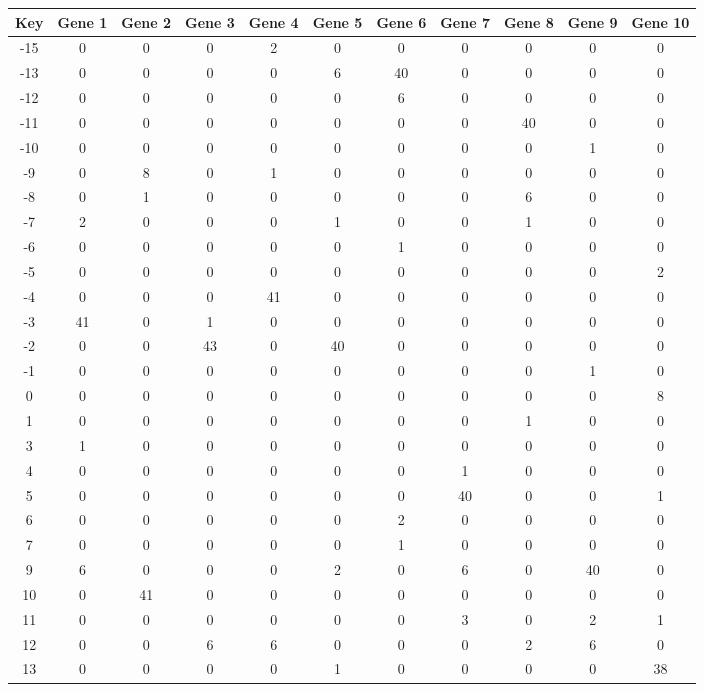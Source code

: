 \begin{tabular}{|c|c|c|c|c|c|c|c|c|c|c|}
\hline
Key & Gene 1 & Gene 2 & Gene 3 & Gene 4 & Gene 5 & Gene 6 & Gene 7 & Gene 8 & Gene 9 & Gene 10 \\
\hline
-15 & 0 & 0 & 0 & 2 & 0 & 0 & 0 & 0 & 0 & 0 \\
-13 & 0 & 0 & 0 & 0 & 6 & 40 & 0 & 0 & 0 & 0 \\
-12 & 0 & 0 & 0 & 0 & 0 & 6 & 0 & 0 & 0 & 0 \\
-11 & 0 & 0 & 0 & 0 & 0 & 0 & 0 & 40 & 0 & 0 \\
-10 & 0 & 0 & 0 & 0 & 0 & 0 & 0 & 0 & 1 & 0 \\
-9 & 0 & 8 & 0 & 1 & 0 & 0 & 0 & 0 & 0 & 0 \\
-8 & 0 & 1 & 0 & 0 & 0 & 0 & 0 & 6 & 0 & 0 \\
-7 & 2 & 0 & 0 & 0 & 1 & 0 & 0 & 1 & 0 & 0 \\
-6 & 0 & 0 & 0 & 0 & 0 & 1 & 0 & 0 & 0 & 0 \\
-5 & 0 & 0 & 0 & 0 & 0 & 0 & 0 & 0 & 0 & 2 \\
-4 & 0 & 0 & 0 & 41 & 0 & 0 & 0 & 0 & 0 & 0 \\
-3 & 41 & 0 & 1 & 0 & 0 & 0 & 0 & 0 & 0 & 0 \\
-2 & 0 & 0 & 43 & 0 & 40 & 0 & 0 & 0 & 0 & 0 \\
-1 & 0 & 0 & 0 & 0 & 0 & 0 & 0 & 0 & 1 & 0 \\
0 & 0 & 0 & 0 & 0 & 0 & 0 & 0 & 0 & 0 & 8 \\
1 & 0 & 0 & 0 & 0 & 0 & 0 & 0 & 1 & 0 & 0 \\
3 & 1 & 0 & 0 & 0 & 0 & 0 & 0 & 0 & 0 & 0 \\
4 & 0 & 0 & 0 & 0 & 0 & 0 & 1 & 0 & 0 & 0 \\
5 & 0 & 0 & 0 & 0 & 0 & 0 & 40 & 0 & 0 & 1 \\
6 & 0 & 0 & 0 & 0 & 0 & 2 & 0 & 0 & 0 & 0 \\
7 & 0 & 0 & 0 & 0 & 0 & 1 & 0 & 0 & 0 & 0 \\
9 & 6 & 0 & 0 & 0 & 2 & 0 & 6 & 0 & 40 & 0 \\
10 & 0 & 41 & 0 & 0 & 0 & 0 & 0 & 0 & 0 & 0 \\
11 & 0 & 0 & 0 & 0 & 0 & 0 & 3 & 0 & 2 & 1 \\
12 & 0 & 0 & 6 & 6 & 0 & 0 & 0 & 2 & 6 & 0 \\
13 & 0 & 0 & 0 & 0 & 1 & 0 & 0 & 0 & 0 & 38 \\
\hline
\end{tabular}
